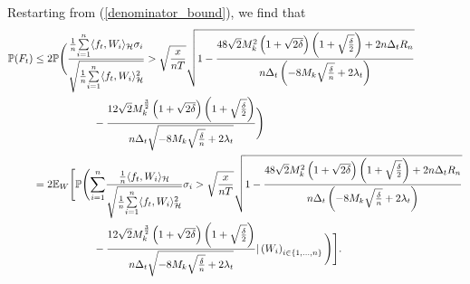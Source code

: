 \documentclass[twoside,11pt]{article}
\newcommand{\Hk}{\mathcal{H}}
\newcommand{\nb}{n}
\newcommand{\PPO}{\mathbb{P} }
\begin{document}
Restarting from (\ref{denominator_bound}), we find that 
\begin{align}
 \PPO (F_t) & \leq 
   2 \PPO \Bigg( \frac{ \frac{1}{\nb} \underset{i=1}{\overset{\nb}{\sum}} \langle f_t ,W_i \rangle_{\Hk} \sigma_i}{\sqrt{\frac{1}{\nb} \underset{i=1}{\overset{\nb}{\sum}} \langle f_t , W_i \rangle_{\Hk}^2}}  \notag >   \sqrt{\frac{x}{\nb T}} \sqrt{1 - \frac{48 \sqrt{2} M_k^2 \left(1+ \sqrt{2\delta}\right) \left(1+ \sqrt{\frac{\delta}{2}}\right) + 2 \nb \Delta_t R_{\nb} }{\nb \Delta_t \left(- 8 M_k \sqrt{\frac{\delta}{\nb}} + 2 \lambda_t\right)}} \\
    & \hspace{2 cm}  - \frac{12 \sqrt{2} M_k^{\frac{3}{2}} \left(1+ \sqrt{2\delta}\right) \left(1+ \sqrt{\frac{\delta}{2}}\right)}{\nb \Delta_t \sqrt{- 8 M_k \sqrt{\frac{\delta}{\nb}} + 2 \lambda_t}} \Bigg)  \notag \\
    &   =  2 \mathbb{E}_{W} \Bigg[ \PPO \Bigg(\underset{i=1}{\overset{\nb}{\sum}} \frac{\frac{1}{\nb} \langle f_t ,W_i \rangle_{\Hk}}{\sqrt{\frac{1}{\nb} \underset{i=1}{\overset{\nb}{\sum}} \langle f_t , W_i \rangle_{\Hk}^2}} \sigma_i      >
     \sqrt{\frac{x}{\nb T}} \sqrt{1 - \frac{48 \sqrt{2} M_k^2 \left(1+ \sqrt{2\delta}\right) \left(1+ \sqrt{\frac{\delta}{2}}\right) + 2 \nb \Delta_t R_{\nb}}{\nb \Delta_t \left(- 8 M_k \sqrt{\frac{\delta}{\nb}} + 2 \lambda_t\right)}} \notag \\
    & \hspace{2 cm} 
    - \frac{12 \sqrt{2} M_k^{\frac{3}{2}} \left(1+ \sqrt{2\delta}\right) \left(1+ \sqrt{\frac{\delta}{2}}\right)}{\nb \Delta_t \sqrt{- 8 M_k \sqrt{\frac{\delta}{\nb}} + 2 \lambda_t}} \vert \left(W_i\right)_{i \in \{1,\ldots,n\}} \Bigg) \Bigg].
    \label{just_before_Hoeffding}
\end{align}
\end{document}
